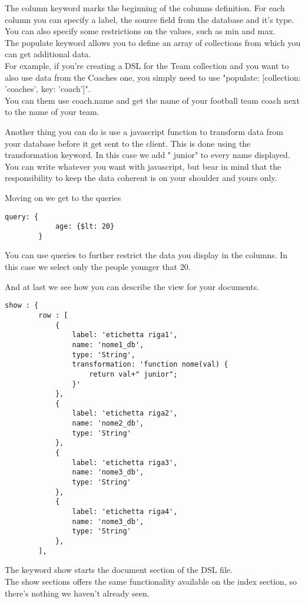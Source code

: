 The column keyword marks the beginning of the columns definition.
For each column you can specify a label, the source field from the database and it's type.
You can also specify some restrictions on the values, such as min and max.\\

The populate keyword allows you to define an array of collections from which you can get additional data.\\
For example, if you're creating a DSL for the Team collection and you want to also use data from the Coaches one, you simply need to use "populate: [{collection: 'coaches', key: 'coach'}]".\\
You can them use coach.name and get the name of your football team coach next to the name of your team.


Another thing you can do is use a javascript function to transform data from your database before it get sent to the client.
This is done using the transformation keyword. In this case we add " junior" to every name displayed.\\
You can write whatever you want with javascript, but bear in mind that the responsibility to keep the data coherent is on your shoulder and yours only.


Moving on we get to the queries\\

\begin{lstlisting}
query: {
			age: {$lt: 20}
		}
\end{lstlisting}
You can use queries to further restrict the data you display in the columns. In this case we select only the people younger that 20.


And at last we see how you can describe the view for your documents.\\

\begin{lstlisting}
show : {
		row : [
			{
				label: 'etichetta riga1',
				name: 'nome1_db',
				type: 'String',
				transformation: 'function nome(val) {	
					return val+" junior";				
				}'
			},
			{	
				label: 'etichetta riga2',
				name: 'nome2_db',
				type: 'String'
			},
			{	
				label: 'etichetta riga3',
				name: 'nome3_db',
				type: 'String'
			},
			{	
				label: 'etichetta riga4',
				name: 'nome3_db',
				type: 'String'
			},
		],

\end{lstlisting}



The keyword show starts the document section of the DSL file.\\
The show sections offers the same functionality available on the index section, so there's nothing we haven't already seen.



